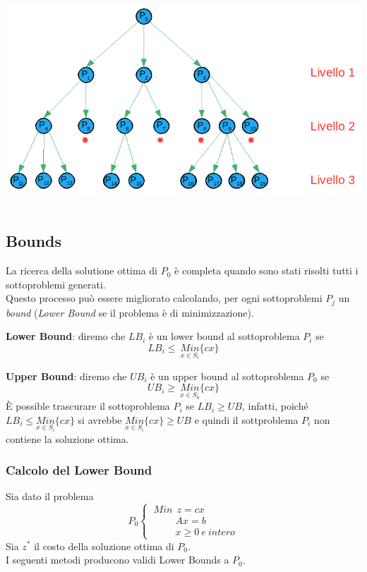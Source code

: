 \begin{center}
	\includegraphics[height=8cm]{images/graph18.png}
\end{center}

\subsection{Bounds}
La ricerca della solutione ottima di $P_{0}$ è completa quando sono stati risolti tutti i sottoproblemi generati.\\
Questo processo può essere migliorato calcolando, per ogni sottoproblemi $P_{j}$ un \textit{bound} (\textit{Lower Bound} se il problema è di minimizzazione).

\textbf{Lower Bound}: diremo che $LB_{i}$ è un lower bound al sottoproblema $P_{i}$ se
\begin{equation*}
LB_{i}\le\ \underset{x\in S_{i}}{Min}\{cx\}
\end{equation*}

\textbf{Upper Bound}: diremo che $UB_{i}$ è un upper bound al sottoproblema $P_{0}$ se
\begin{equation*}
UB_{i}\ge\ \underset{x\in S_{0}}{Min}\{cx\}
\end{equation*}
È possible trascurare il sottoproblema $P_{i}$ se $LB_{i}\ge UB$, infatti, poiché $LB_{i}\le \underset{x\in S_{i}}{Min}\{cx\}$ si avrebbe $\underset{x\in S_{i}}{Min}\{cx\}\ge UB$ e quindi il sottproblema $P_{i}$ non contiene la soluzione ottima.
\clearpage
\subsubsection{Calcolo del Lower Bound}
Sia dato il problema
\begin{displaymath}
P_{0}
\begin{cases}
\ Min\ \ z=cx\\
\ \ \ \ \ \ \ \ \ \ \ A x = b\\
\ \ \ \ \ \ \ \ \ \ \ x \ge 0\ e\:intero
\end{cases}
\end{displaymath}
Sia $z^{*}$ il costo della soluzione ottima di $P_{0}$.\\
I seguenti metodi producono validi Lower Bounds a $P_{0}$.

